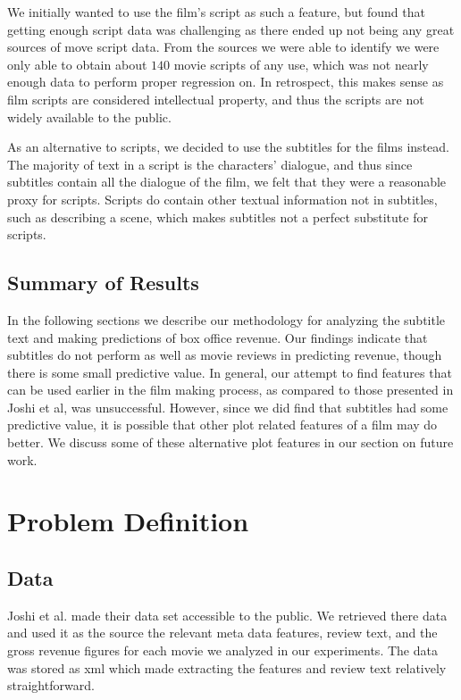 \documentclass[11pt]{article}
\begin{document}
We initially wanted to use the film's script as such a feature, but found that getting
enough script data was challenging as there ended up not being any great sources of
move script data. From the sources we were able to identify we were only able to
obtain about $140$ movie scripts of any use, which was not nearly enough data to perform
proper regression on. In retrospect, this makes sense as film scripts are considered
intellectual property, and thus the scripts are not widely available to the public.

As an alternative to scripts, we decided to use the subtitles for the films instead. The
majority of text in a script is the characters' dialogue, and thus since subtitles contain
all the dialogue of the film, we felt that they were a reasonable proxy for scripts.
Scripts do contain other textual information not in subtitles, such as describing a scene,
which makes subtitles not a perfect substitute for scripts.

\subsection{Summary of Results}
In the following sections we describe our methodology for analyzing the subtitle text
and making predictions of box office revenue. Our findings indicate that subtitles do
not perform as well as movie reviews in predicting revenue, though there is some small
predictive value. In general, our attempt to find features that can be used
earlier in the film making process, as compared to those presented in Joshi et al, was 
unsuccessful. However, since we did find that subtitles had some predictive value, it is possible that other plot related features of a film may do better. We discuss some of
these alternative plot features in our section on future work.

\section{Problem Definition}
\subsection{Data}
Joshi et al. made their data set accessible to the public. We retrieved there data
and used it as the source the relevant meta data features, review text, and the gross revenue figures for each movie we analyzed in our experiments. The data was stored as
xml which made extracting the features and review text relatively straightforward.
\end{document}
